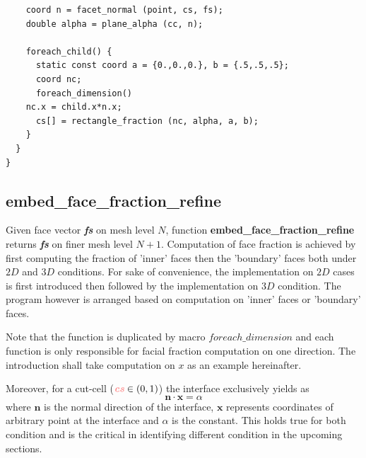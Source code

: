 \documentclass[a4paper]{article}
\newcommand{\func}[1]{\textbf{\textcolor{function}{#1}}}
\newcommand{\para}[1]{\textbf{\emph{\textcolor{para}{#1}}}}
\begin{document}
\begin{multicols}{2}
 \columnbreak
 \begin{verbatim}
    coord n = facet_normal (point, cs, fs);
    double alpha = plane_alpha (cc, n);
      
    foreach_child() {
      static const coord a = {0.,0.,0.}, b = {.5,.5,.5};
      coord nc;
      foreach_dimension()
	nc.x = child.x*n.x;
      cs[] = rectangle_fraction (nc, alpha, a, b);
    }
  }
}
 \end{verbatim}
\end{multicols}

\subsection{\func{embed\_face\_fraction\_refine}}
Given face vector \para{fs} on mesh level $N$, function \func{embed\_face\_fraction\_refine} returns \para{fs} on finer mesh level $N+1$. Computation of face fraction is achieved by first computing the fraction of 'inner' faces then the 'boundary' faces both under $2D$ and $3D$ conditions. For sake of convenience, the implementation on $2D$ cases is first introduced then followed by the implementation on $3D$ condition. The program however is arranged based on computation on 'inner' faces or 'boundary' faces.\par
Note that the function is duplicated by macro $foreach\_dimension$ and each function is only responsible for facial fraction computation on one direction. The introduction shall take computation on $x$ as an example hereinafter.\par
Moreover, for a cut-cell ($\para{cs} \in (0,1)$) the interface exclusively yields as 
\begin{equation}\label{equ:interface}
    \mathbf{n}\cdot\mathbf{x} = \alpha
\end{equation}
where $\mathbf{n}$ is the normal direction of the interface, $\mathbf{x}$ represents coordinates of arbitrary point at the interface and $\alpha$ is the constant. This holds true for both condition and is the critical in identifying different condition in the upcoming sections.
\end{document}

